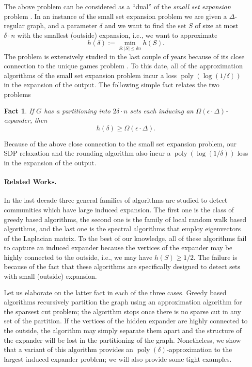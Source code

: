\documentclass[11pt]{article}
\def\eps{\epsilon}
\DeclareMathOperator{\poly}{poly}
\def\h{h}
\newtheorem{fact}[theorem]{Fact}
\begin{document}
The above problem can be considered as a ``dual'' of the \emph{small set expansion} problem \cite{RS10}. In an instance of the small set expansion problem we are given a $\Delta$-regular graph, and a parameter $\delta$ and we want to find the set $S$ of size at most $\delta\cdot n$ with the smallest (outside) expansion, i.e., we want to approximate 
$$ \h(\delta):=\min_{S: |S|\leq \delta n} \h(S).$$
The problem is extensively studied in the last couple of years because of its close connection to the unique games problem \cite{RST10,BFKM11,OT12,KL12}. To this date, all of the  approximation algorithms of the small set expansion problem incur a loss $\poly(\log(1/\delta))$ in the expansion of the output. The following simple fact relates the two problems
\begin{fact}
	If $G$ has a partitioning into $2\delta\cdot n$ sets each inducing an $\Omega(\eps\cdot \Delta)$-expander,  then 
	$$\h(\delta)\geq \Omega(\eps\cdot\Delta).$$
\end{fact}
Because of the above close connection to the small set expansion problem, our SDP relaxation and the rounding algorithm also incur a $\poly(\log(1/\delta))$ loss in the expansion of the output.

\paragraph{Related Works.}
In the last decade three general families of algorithms are studied to detect communities which have large induced expansion. The first one is the class of  greedy based algorithms, the second one is the family of local random walk based algorithms, and the last one is the  spectral algorithms that employ eigenvectors of the Laplacian matrix. To the best of our knowledge, all of these algorithms  fail to capture an induced expander because the vertices of the expander may be highly connected to the outside, i.e., we may have $h(S)\geq 1/2$.
The failure is because of the fact that these algorithms are specifically designed to detect sets with small (outside) expansion.

Let us elaborate on the latter fact in each of the three cases. Greedy based algorithms \cite{KVV04,Tre05,AO14} recursively partition the graph using an approximation algorithm for the sparsest cut problem; the algorithm stops once there is no sparse cut in any set of the partition. If the vertices of the hidden expander are highly connected to the outside, the algorithm may simply separate them apart and the structure of the expander will be lost in the partitioning of the graph. Nonetheless, we show that a variant of this algorithm provides an $\poly(\delta)$-approximation to the largest induced expander problem; we will also provide some tight examples.
\end{document}
